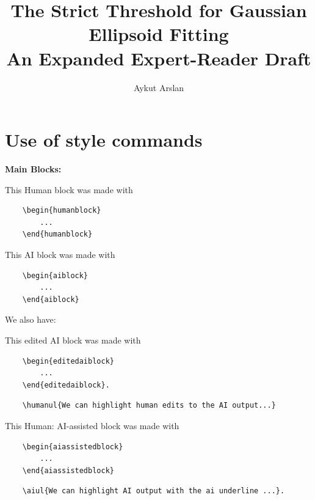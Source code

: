 \documentclass[11pt,reqno]{amsart}
\title[Strict threshold for Gaussian ellipsoid fitting]
{The Strict Threshold for Gaussian Ellipsoid Fitting\\
{\large An Expanded Expert-Reader Draft}}
\author{Aykut Arslan}
\date{}
\numberwithin{equation}{section}
\theoremstyle{definition}
\theoremstyle{remark}
\newcommand{\1}{\boldsymbol 1}
\begin{document}
\section{Use of style commands}


%
\textbf{Main Blocks:}


\begin{humanblock}
This Human block was made with 

\begin{verbatim}
    \begin{humanblock}
        ...
    \end{humanblock}
\end{verbatim}


    \lipsum[1]
\end{humanblock}


\begin{aiblock}
This AI block was made with 

\begin{verbatim}
    \begin{aiblock}
        ...
    \end{aiblock}
\end{verbatim}


    \lipsum[2]
\end{aiblock}


We also have:

\begin{editedaiblock}
This edited AI block was made with 

\begin{verbatim}
    \begin{editedaiblock}
        ...
    \end{editedaiblock}.
\end{verbatim}

\begin{verbatim}
    \humanul{We can highlight human edits to the AI output...}
\end{verbatim}
    \lipsum[3]
\end{editedaiblock}

\begin{aiassistedblock}
This Human: AI-assisted block was made with
\begin{verbatim}
    \begin{aiassistedblock}
        ...
    \end{aiassistedblock}
\end{verbatim}


\begin{verbatim}
    \aiul{We can highlight AI output with the ai underline ...}.
\end{verbatim}


    \lipsum[4]
\end{aiassistedblock}
\end{document}
